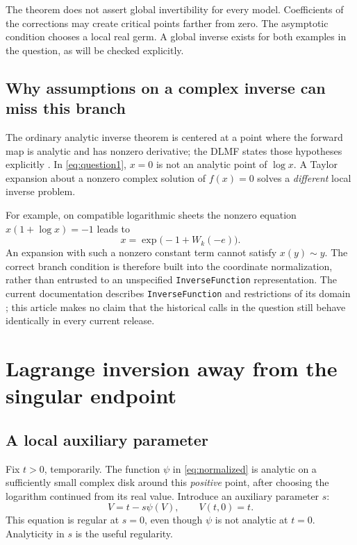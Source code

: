 \documentclass[11pt,a4paper]{article}
\numberwithin{equation}{section}
\theoremstyle{definition}
\newcommand{\code}[1]{\texttt{#1}}
\begin{document}
The theorem does not assert global invertibility for every model.
Coefficients of the corrections may create critical points farther from
zero. The asymptotic condition chooses a local real germ. A global inverse
exists for both examples in the question, as will be checked explicitly.

\subsection{Why assumptions on a complex inverse can miss this branch}
The ordinary analytic inverse theorem is centered at a point where the
forward map is analytic and has nonzero derivative; the DLMF states those
hypotheses explicitly \cite{dlmf}. In \eqref{eq:question1}, $x=0$ is not
an analytic point of $\log x$. A Taylor expansion about a nonzero complex
solution of $f(x)=0$ solves a \emph{different} local inverse problem.

For example, on compatible logarithmic sheets the nonzero equation
$x(1+\log x)=-1$ leads to
\[
 x=\exp\bigl(-1+W_k(-e)\bigr).
\]
An expansion with such a nonzero constant term cannot satisfy
$x(y)\sim y$. The correct branch condition is therefore built into the
coordinate normalization, rather than entrusted to an unspecified
\code{InverseFunction} representation. The current documentation describes
\code{InverseFunction} and restrictions of its domain \cite{inversefunction};
this article makes no claim that the historical calls in the question
still behave identically in every current release.

\section{Lagrange inversion away from the singular endpoint}\label{sec:lagrange}

\subsection{A local auxiliary parameter}
Fix $t>0$, temporarily. The function $\psi$ in \eqref{eq:normalized} is
analytic on a sufficiently small complex disk around this \emph{positive}
point, after choosing the logarithm continued from its real value.
Introduce an auxiliary parameter $s$:
\begin{equation}\label{eq:homotopy}
 V=t-s\psi(V),\qquad V(t,0)=t.
\end{equation}
This equation is regular at $s=0$, even though $\psi$ is not analytic at
$t=0$. Analyticity in $s$ is the useful regularity.
\end{document}
